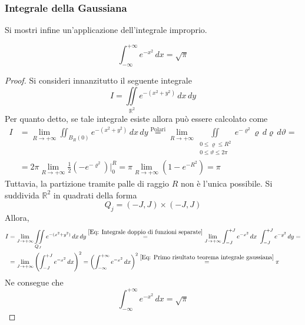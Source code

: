 \subsubsection{Integrale della Gaussiana}
Si mostri infine un'applicazione dell'integrale improprio.
\begin{theorem}
    \begin{equation}
    \int_{-\infty}^{+\infty}{e^{-x^2}}\, dx = \sqrt{\pi}
    \end{equation}
\end{theorem}
\begin{proof}
    Si consideri innanzitutto il seguente integrale
    \begin{equation}
        I=\iint\limits_{\mathbb{R}^2}{e^{-(x^2+y^2)}}\,dx\,dy
    \end{equation}
    Per quanto detto, se tale integrale esiste allora può essere calcolato come
    \begin{equation} \label{Eq: Primo risultato teorema integrale gaussiana}
    \begin{aligned}
        I&=\lim_{R \to +\infty}{\iint_{B_R(0)}{e^{-(x^2+y^2)}}}\,dx\,dy \overset{\text{Polari}}{=} \lim_{R \to +\infty}{\iint\limits_{\substack{0 \leq \varrho \leq R^2\\ 0 \leq \vartheta \leq 2\pi}}{e^{-\varrho^2} \varrho}\,d\varrho\,d\vartheta}=\\
        &= 2\pi \lim_{R \to +\infty}{\frac{1}{2}}{\left( -e^{-\varrho^2}\right) \Big|_{0}^{R}}= \pi \lim_{R \to +\infty}{(1-e^{-R^2})}= \pi
    \end{aligned}
    \end{equation}
    Tuttavia, la partizione tramite palle di raggio $R$ non è l'unica possibile. Si suddivida $\mathbb{R}^2$ in quadrati della forma
    \begin{equation}
        Q_j=(-J,J) \times (-J, J)
    \end{equation}
    Allora, 
    \begin{equation}
    \begin{aligned}
        I&= \lim_{J \to +\infty}{\iint\limits_{Q_J}{e^{-(x^2+y^2)}}\,dx\,dy}\overset{\eqref{Eq: Integrale doppio di funzioni separate}}{=} \lim_{J \to +\infty}{\int_{-J}^{+J}{e^{-x^2}}\, dx\ \int_{-J}^{+J}{e^{-y^2}}\,dy}=\\
        &=\lim_{J \to + \infty}\left(\int_{-J}^{+J}{ e^{-x^2}}\,dx\right)^2 = \left(\int_{-\infty}^{+\infty}{ e^{-x^2}}\,dx\right)^2 \overset{\eqref{Eq: Primo risultato teorema integrale gaussiana}}{=} \pi
    \end{aligned}
    \end{equation}
    Ne consegue che
    \begin{equation}
        \int_{-\infty}^{+\infty}{e^{-x^2}}\, dx = \sqrt{\pi}
    \end{equation}
\end{proof}